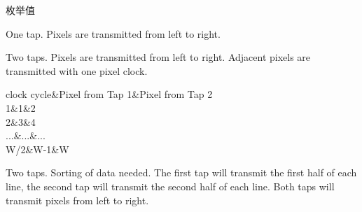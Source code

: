 \begin{Desc}
\item[枚举值]\par
\begin{description}
\item[{\em 
\hypertarget{group___device_specific_interface_gga25ba65893f1ee0e7de99cb51bb858d99ac8a86d822579e506edc8ea9b9fd0f962}{cltxg1\+X}\label{group___device_specific_interface_gga25ba65893f1ee0e7de99cb51bb858d99ac8a86d822579e506edc8ea9b9fd0f962}
}]One tap. Pixels are transmitted from left to right. \item[{\em 
\hypertarget{group___device_specific_interface_gga25ba65893f1ee0e7de99cb51bb858d99aea83f31ec6ec8fe99d861887a4065a16}{cltxg1\+X2}\label{group___device_specific_interface_gga25ba65893f1ee0e7de99cb51bb858d99aea83f31ec6ec8fe99d861887a4065a16}
}]Two taps. Pixels are transmitted from left to right. Adjacent pixels are transmitted with one pixel clock.

\begin{TabularC}{3}
\hline
clock cycle&Pixel from Tap 1&Pixel from Tap 2 \\
1&1&2 \\
2&3&4 \\
...&...&... \\
W/2&W-\/1&W \\
\end{TabularC}
\item[{\em 
\hypertarget{group___device_specific_interface_gga25ba65893f1ee0e7de99cb51bb858d99a152a7fb12612fb1f1d4e74d3a0339e8a}{cltxg2\+X}\label{group___device_specific_interface_gga25ba65893f1ee0e7de99cb51bb858d99a152a7fb12612fb1f1d4e74d3a0339e8a}
}]Two taps. Sorting of data needed. The first tap will transmit the first half of each line, the second tap will transmit the second half of each line. Both taps will transmit pixels from left to right.


\end{description}
\end{Desc}
